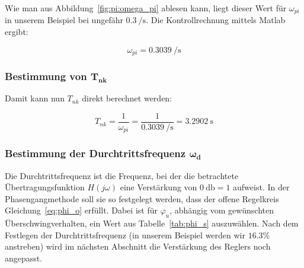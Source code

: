 Wie    man   aus    Abbildung~\ref{fig:pi:omega_pi}   ablesen    kann,   liegt
dieser   Wert  f\"ur   $\omega_{pi}$  in   unserem  Beispiel   bei  ungef\"ahr
$\SI{0.3}{\per\second}$. Die Kontrollrechnung mittels Matlab ergibt:

\begin{equation} \label{eq:pi:omega_pi}
    \omega_{pi} = \SI{0.3039}{\per\second}
\end{equation}


\subsubsection{Bestimmung von $\mathbf{T_{nk}}$}
Damit kann nun $T_{nk}$ direkt berechnet werden\footnotemark[5]:

\begin{equation} \label{eq:pi:omega_pi}
    T_{nk} = \frac{1}{\omega_{pi}} = \frac{1}{\SI{0.3039}{\per\second}} = \SI{3.2902}{\second}
\end{equation}



\subsubsection{Bestimmung der Durchtrittsfrequenz $\mathbf{\boldsymbol{\omega}_d}$}

Die   Durchtrittsfrequenz  ist   die   Frequenz,  bei   der  die   betrachtete
\"Ubertragungsfunktion $H(j\omega)$ eine Verst\"arkung von $\SI{0}{\decibel} =
1$  aufweist. In der  Phasengangmethode soll  sie so  festgelegt werden,  dass
der  offene  Regelkreis  Gleichung~\ref{eq:phi_o} erf\"ullt. Dabei  ist  f\"ur
$\varphi_u$, abh\"angig vom gew\"unschten \"Uberschwingverhalten, ein Wert aus
Tabelle~\ref{tab:phi_s} auszuw\"ahlen\footnotemark[6].  Nach dem Festlegen der
Durchtrittsfrequenz (in  unserem Beispiel werden wir  $16.3\%$ anstreben) wird
im n\"achsten Abschnitt die Verst\"arkung des Reglers noch angepasst.

